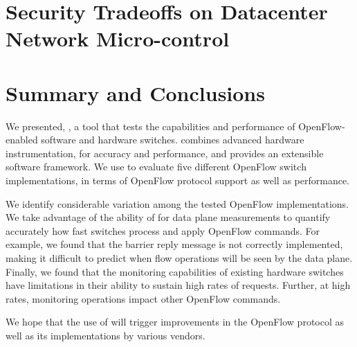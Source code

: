 \section{Security Tradeoffs on Datacenter Network Micro-control} \label{sec:rdsf-eval}

\section{Summary and Conclusions}\label{sec:conclusion}
We presented, \oflops, a tool that tests the capabilities and performance of 
OpenFlow-enabled software and hardware switches. \oflops combines advanced 
hardware instrumentation, for accuracy and performance, and provides an extensible 
software framework. We use \oflops to evaluate five different OpenFlow switch 
implementations, in terms of OpenFlow protocol support as well as performance.

We identify considerable variation among the tested OpenFlow implementations.
We take advantage of the ability of \oflops for data plane measurements to
quantify accurately how fast switches process and apply OpenFlow commands.
For example, we found that the barrier reply message is not correctly implemented,
making it difficult to predict when flow operations will be seen by the data plane.
Finally, we found that the monitoring capabilities of existing hardware switches 
have limitations in their ability to sustain high rates of requests. Further, at high 
rates, monitoring operations impact other OpenFlow commands.

We hope that the use of \oflops will trigger improvements in the
OpenFlow protocol as well as its implementations by various vendors.



